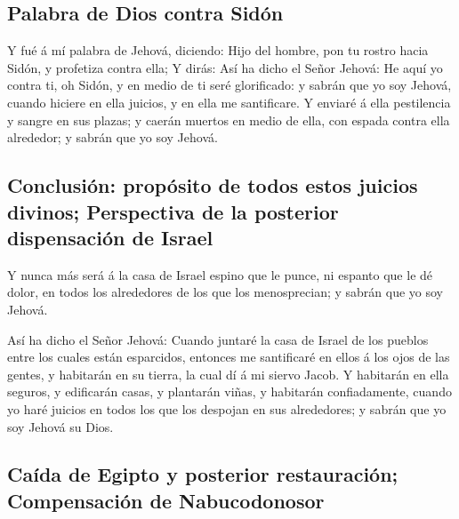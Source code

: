 \hypertarget{palabra-de-dios-contra-siduxf3n}{%
\subsection{Palabra de Dios contra
Sidón}\label{palabra-de-dios-contra-siduxf3n}}

 Y fué á mí palabra de Jehová, diciendo:  Hijo
del hombre, pon tu rostro hacia Sidón, y profetiza contra ella;
 Y dirás: Así ha dicho el Señor Jehová: He aquí yo contra
ti, oh Sidón, y en medio de ti seré glorificado: y sabrán que yo soy
Jehová, cuando hiciere en ella juicios, y en ella me santificare.
 Y enviaré á ella pestilencia y sangre en sus plazas; y
caerán muertos en medio de ella, con espada contra ella alrededor; y
sabrán que yo soy Jehová.

\hypertarget{conclusiuxf3n-propuxf3sito-de-todos-estos-juicios-divinos-perspectiva-de-la-posterior-dispensaciuxf3n-de-israel}{%
\subsection{Conclusión: propósito de todos estos juicios divinos;
Perspectiva de la posterior dispensación de
Israel}\label{conclusiuxf3n-propuxf3sito-de-todos-estos-juicios-divinos-perspectiva-de-la-posterior-dispensaciuxf3n-de-israel}}

 Y nunca más será á la casa de Israel espino que le punce,
ni espanto que le dé dolor, en todos los alrededores de los que los
menosprecian; y sabrán que yo soy Jehová.

 Así ha dicho el Señor Jehová: Cuando juntaré la casa de
Israel de los pueblos entre los cuales están esparcidos, entonces me
santificaré en ellos á los ojos de las gentes, y habitarán en su tierra,
la cual dí á mi siervo Jacob.  Y habitarán en ella seguros,
y edificarán casas, y plantarán viñas, y habitarán confiadamente, cuando
yo haré juicios en todos los que los despojan en sus alrededores; y
sabrán que yo soy Jehová su Dios.

\hypertarget{cauxedda-de-egipto-y-posterior-restauraciuxf3n-compensaciuxf3n-de-nabucodonosor}{%
\subsection{Caída de Egipto y posterior restauración; Compensación de
Nabucodonosor}\label{cauxedda-de-egipto-y-posterior-restauraciuxf3n-compensaciuxf3n-de-nabucodonosor}}

